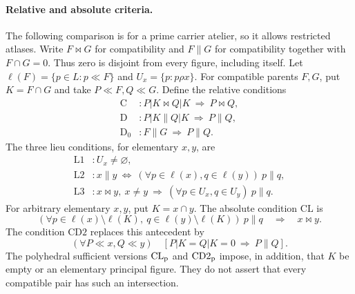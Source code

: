 \paragraph{Relative and absolute criteria.}
The following comparison is for a prime carrier atelier, so it allows
restricted atlases. Write $F\bowtie G$ for compatibility and
$F\parallel G$ for compatibility together with $F\cap G=0$.
Thus zero is disjoint from every figure, including itself.
Let $\ell(F)=\{p\in L:p\ll F\}$ and $U_x=\{p:p\rho x\}$.
For compatible parents $F,G$, put $K=F\cap G$ and take
$P\ll F,Q\ll G$. Define the relative conditions
\[
\begin{aligned}
 \mathrm C &: P|K\bowtie Q|K\ \Longrightarrow\ P\bowtie Q,\\
 \mathrm D &: P|K\parallel Q|K\ \Longrightarrow\ P\parallel Q,\\
 \mathrm D_0 &: F\parallel G\ \Longrightarrow\ P\parallel Q.
\end{aligned}
\]
The three lieu conditions, for elementary $x,y$, are
\[
\begin{aligned}
 \mathrm L1 &: U_x\ne\varnothing,\\
 \mathrm L2 &: x\parallel y\ \Longleftrightarrow\
  (\forall p\in\ell(x),q\in\ell(y))\ p\parallel q,\\
 \mathrm L3 &: x\bowtie y,\ x\ne y\ \Longrightarrow\
  (\forall p\in U_x,q\in U_y)\ p\parallel q.
\end{aligned}
\]
For arbitrary elementary $x,y$, put $K=x\cap y$. The absolute
condition $\mathrm{CL}$ is
\[
 (\forall p\in\ell(x)\setminus\ell(K),\ q\in\ell(y)\setminus\ell(K))
       \ p\parallel q\quad\Longrightarrow\quad x\bowtie y.
\]
The condition $\mathrm{CD2}$ replaces this antecedent by
\[
 (\forall P\ll x,Q\ll y)\quad
 [P|K=Q|K=0\ \Longrightarrow\ P\parallel Q].
\]
The polyhedral sufficient versions $\mathrm{CL}_{\rm p}$ and
$\mathrm{CD2}_{\rm p}$ impose, in addition, that $K$ be empty or
an elementary principal figure. They do not assert that every
compatible pair has such an intersection.

